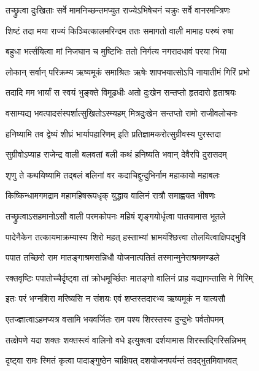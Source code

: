 \twolineshloka
{तच्छ्रुत्वा दुःखिताः सर्वे मामनिच्छन्तमप्युत}
{राज्येऽभिषेचनं चक्रुः सर्वे वानरमन्त्रिणः} %

\twolineshloka
{शिष्टं तदा मया राज्यं किञ्चित्कालमरिन्दम}
{ततः समागतो वाली मामाह परुषं रुषा} %

\twolineshloka
{बहुधा भर्त्सयित्वा मां निजघान च मुष्टिभिः}
{ततो निर्गत्य नगरादधावं परया भिया} %

\twolineshloka
{लोकान् सर्वान् परिक्रम्य ऋष्यमूकं समाश्रितः}
{ऋषेः शापभयात्सोऽपि नायातीमं गिरिं प्रभो} %

\twolineshloka
{तदादि मम भार्यां स स्वयं भुङ्क्ते विमूढधीः}
{अतो दुःखेन सन्तप्तो हृतदारो हृताश्रयः} %

\twolineshloka
{वसाम्यद्य भवत्पादसंस्पर्शात्सुखितोऽस्म्यहम्}
{मित्रदुःखेन सन्तप्तो रामो राजीवलोचनः} %

\twolineshloka
{हनिष्यामि तव द्वेष्यं शीघ्रं भार्यापहारिणम्}
{इति प्रतिज्ञामकरोत्सुग्रीवस्य पुरस्तदा} %

\twolineshloka
{सुग्रीवोऽप्याह राजेन्द्र वाली बलवतां बली}
{कथं हनिष्यति भवान् देवैरपि दुरासदम्} %

\twolineshloka
{शृणु ते कथयिष्यामि तद्बलं बलिनां वर}
{कदाचिद्दुन्दुभिर्नाम महाकायो महाबलः} %

\twolineshloka
{किष्किन्धामगमद्राम महामहिषरूपधृक्}
{युद्धाय वालिनं रात्रौ समाह्वयत भीषणः} %

\twolineshloka
{तच्छ्रुत्वाऽसहमानोऽसौ वाली परमकोपनः}
{महिषं शृङ्गयोर्धृत्वा पातयामास भूतले} %

\twolineshloka
{पादेनैकेन तत्कायमाक्रम्यास्य शिरो महत्}
{हस्ताभ्यां भ्रामयंश्छित्त्वा तोलयित्वाक्षिपद्भुवि} %

\twolineshloka
{पपात तच्छिरो राम मातङ्गाश्रमसन्निधौ}
{योजनात्पतितं तस्मान्मुनेराश्रममण्डले} %

\twolineshloka
{रक्तवृष्टिः पपातोच्चैर्दृष्ट्वा तां क्रोधमूर्च्छितः}
{मातङ्गो वालिनं प्राह यद्यागन्तासि मे गिरिम्} %

\twolineshloka
{इतः परं भग्नशिरा मरिष्यसि न संशयः}
{एवं शप्तस्तदारभ्य ऋष्यमूकं न यात्यसौ} %

\twolineshloka
{एतज्ज्ञात्वाऽहमप्यत्र वसामि भयवर्जितः}
{राम पश्य शिरस्तस्य दुन्दुभेः पर्वतोपमम्} %

\twolineshloka
{तत्क्षेपणे यदा शक्तः शक्तस्त्वं वालिनो वधे}
{इत्युक्त्वा दर्शयामास शिरस्तद्गिरिसन्निभम्} %

\twolineshloka
{दृष्ट्वा रामः स्मितं कृत्वा पादाङ्गुष्ठेन चाक्षिपत्}
{दशयोजनपर्यन्तं तदद्भुतमिवाभवत्} %

